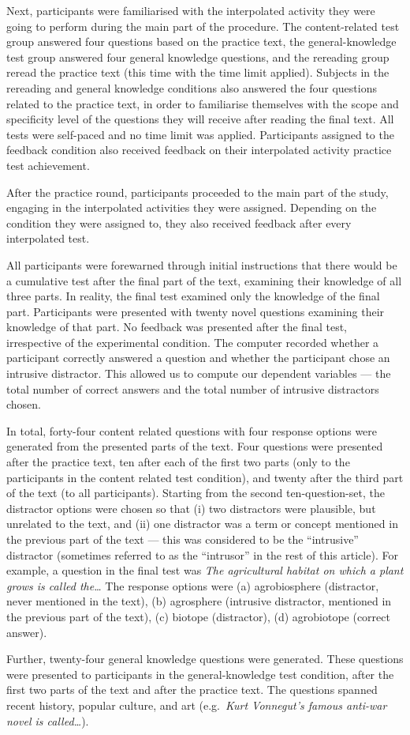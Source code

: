 \documentclass[../main.tex]{subfiles}
\begin{document}
Next, participants were familiarised with the interpolated activity they
were going to perform during the main part of the procedure. The
content-related test group answered four questions based on the practice
text, the general-knowledge test group answered four general knowledge
questions, and the rereading group reread the practice text (this time
with the time limit applied). Subjects in the rereading and general
knowledge conditions also answered the four questions related to the
practice text, in order to familiarise themselves with the scope and
specificity level of the questions they will receive after reading the
final text. All tests were self-paced and no time limit was applied.
Participants assigned to the feedback condition also received feedback
on their interpolated activity practice test achievement.

After the practice round, participants proceeded to the main part of the
study, engaging in the interpolated activities they were assigned.
Depending on the condition they were assigned to, they also received
feedback after every interpolated test.

All participants were forewarned through initial instructions that there
would be a cumulative test after the final part of the text, examining
their knowledge of all three parts. In reality, the final test examined
only the knowledge of the final part. Participants were presented with
twenty novel questions examining their knowledge of that part. No
feedback was presented after the final test, irrespective of the
experimental condition. The computer recorded whether a participant
correctly answered a question and whether the participant chose an
intrusive distractor. This allowed us to compute our dependent variables
--- the total number of correct answers and the total number of
intrusive distractors chosen.

In total, forty-four content related questions with four response
options were generated from the presented parts of the text. Four
questions were presented after the practice text, ten after each of the
first two parts (only to the participants in the content related test
condition), and twenty after the third part of the text (to all
participants). Starting from the second ten-question-set, the distractor
options were chosen so that (i) two distractors were plausible, but
unrelated to the text, and (ii) one distractor was a term or concept
mentioned in the previous part of the text --- this was considered to be
the ``intrusive'' distractor (sometimes referred to as the ``intrusor''
in the rest of this article). For example, a question in the final test
was
\textit{The agricultural habitat on which a plant grows is called the\ldots}
The response options were (a) agrobiosphere (distractor, never mentioned
in the text), (b) agrosphere (intrusive distractor, mentioned in the
previous part of the text), (c) biotope (distractor), (d) agrobiotope
(correct answer).

Further, twenty-four general knowledge questions were generated. These
questions were presented to participants in the general-knowledge test
condition, after the first two parts of the text and after the practice
text. The questions spanned recent history, popular culture, and art
(e.g.~\textit{Kurt Vonnegut's famous anti-war novel
is called\ldots}).
\end{document}
